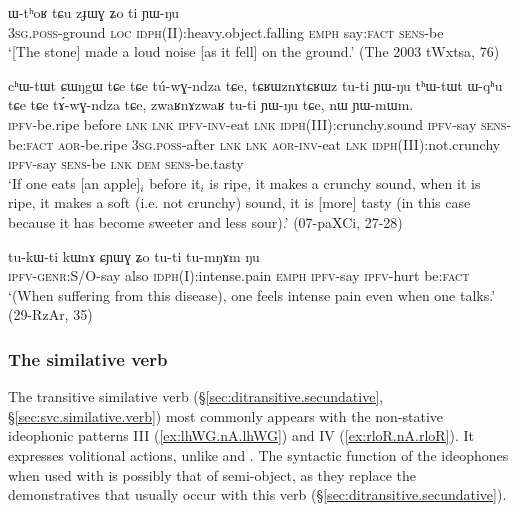 \begin{exe}
\ex \label{ex:zJWG.Zo}
\gll ɯ-tʰoʁ tɕu zɟɯɣ ʑo ti ɲɯ-ŋu\\
\textsc{3sg}.\textsc{poss}-ground \textsc{loc} \textsc{idph}(II):heavy.object.falling \textsc{emph} say:\textsc{fact} \textsc{sens}-be\\
\glt `[The stone] made a loud noise [as it fell] on the ground.' (The 2003 tWxtsa, 76)
\end{exe}


\begin{exe}
\ex \label{ex:tCRWz.nA.tCRWz}
\gll cʰɯ-tɯt ɕɯŋgɯ tɕe tɕe tú-wɣ-ndza tɕe, tɕʁɯznɤtɕʁɯz tu-ti ɲɯ-ŋu tʰɯ-tɯt ɯ-qʰu tɕe tɕe tɤ́-wɣ-ndza tɕe, zwaʁnɤzwaʁ tu-ti ɲɯ-ŋu tɕe, nɯ ɲɯ-mɯm. \\
\textsc{ipfv}-be.ripe before \textsc{lnk} \textsc{lnk} \textsc{ipfv}-\textsc{inv}-eat \textsc{lnk} \textsc{idph}(III):crunchy.sound \textsc{ipfv}-say \textsc{sens}-be:\textsc{fact} \textsc{aor}-be.ripe \textsc{3sg}.\textsc{poss}-after \textsc{lnk} \textsc{lnk} \textsc{aor}-\textsc{inv}-eat \textsc{lnk} \textsc{idph}(III):not.crunchy \textsc{ipfv}-say \textsc{sens}-be \textsc{lnk} \textsc{dem} \textsc{sens}-be.tasty \\
\glt `If one eats [an apple]$_i$ before it$_i$ is ripe, it makes a crunchy sound, when it is ripe, it makes a soft (i.e. not crunchy) sound, it is [more] tasty (in this case because it has become sweeter and less sour).' (07-paXCi, 27-28)
\end{exe}

\begin{exe}
\ex \label{ex:CYWG.Zo}
\gll tu-kɯ-ti kɯnɤ ɕɲɯɣ ʑo tu-ti tu-mŋɤm ŋu \\
\textsc{ipfv}-\textsc{genr}:S/O-say also \textsc{idph}(I):intense.pain \textsc{emph} \textsc{ipfv}-say \textsc{ipfv}-hurt be:\textsc{fact} \\
\glt `(When suffering from this disease), one feels intense pain even when one talks.' (29-RzAr, 35)
\end{exe}


\subsubsection{The similative verb  } \label{sec:stu.idph} 
The transitive similative verb   (§\ref{sec:ditransitive.secundative}, §\ref{sec:svc.similative.verb}) most commonly appears with the non-stative ideophonic patterns III (\ref{ex:lhWG.nA.lhWG})  and IV (\ref{ex:rloR.nA.rloR}). It expresses volitional actions, unlike  and .  The syntactic function of the ideophones when used with  is possibly that of semi-object, as they replace the demonstratives that usually occur with this verb (§\ref{sec:ditransitive.secundative}).

